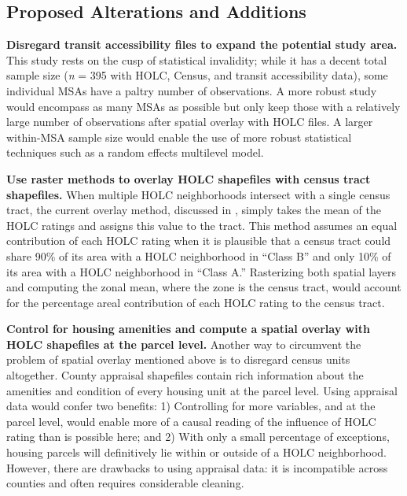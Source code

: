 \documentclass[paper=letter, fontsize=12pt]{scrartcl} %
\begin{document}
\subsection{Proposed Alterations and Additions}
\textbf{Disregard transit accessibility files to expand the potential study area.} This study rests on the cusp of statistical invalidity; while it has a decent total sample size (\textit{n} = 395 with HOLC, Census, and transit accessibility data), some individual MSAs have a paltry number of observations. A more robust study would encompass as many MSAs as possible but only keep those with a relatively large number of observations after spatial overlay with HOLC files. A larger within-MSA sample size would enable the use of more robust statistical techniques such as a random effects multilevel model.\par
\textbf{Use raster methods to overlay HOLC shapefiles with census tract shapefiles.} When multiple HOLC neighborhoods intersect with a single census tract, the current overlay method, discussed in , simply takes the mean of the HOLC ratings and assigns this value to the tract. This method assumes an equal contribution of each HOLC rating when it is plausible that a census tract could share 90\% of its area with a HOLC neighborhood in ``Class B'' and only 10\% of its area with a HOLC neighborhood in ``Class A.'' Rasterizing both spatial layers and computing the zonal mean, where the zone is the census tract, would account for the percentage areal contribution of each HOLC rating to the census tract. \par
\textbf{Control for housing amenities and compute a spatial overlay with HOLC shapefiles at the parcel level.} Another way to circumvent the problem of spatial overlay mentioned above is to disregard census units altogether. County appraisal shapefiles contain rich information about the amenities and condition of every housing unit at the parcel level. Using appraisal data would confer two benefits: 1) Controlling for more variables, and at the parcel level, would enable more of a causal reading of the influence of HOLC rating than is possible here; and 2) With only a small percentage of exceptions, housing parcels will definitively lie within or outside of a HOLC neighborhood. However, there are drawbacks to using appraisal data: it is incompatible across counties and often requires considerable cleaning.

\end{document}
